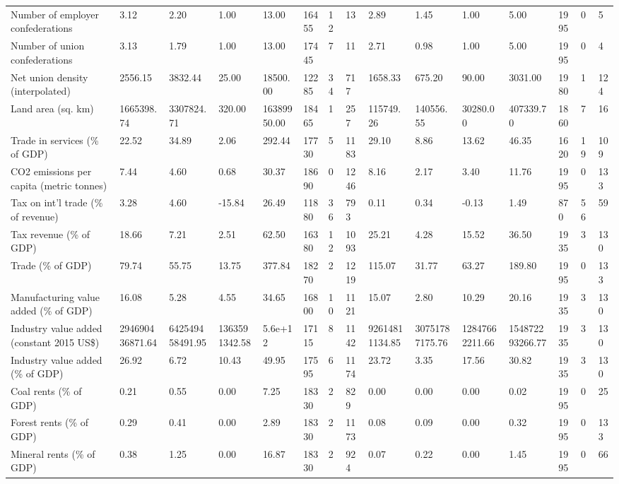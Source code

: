 \begin{longtable}{lllllllllllllll}
\addlinespace
Number of employer confederations & 3.12 & 2.20 & 1.00 & 13.00 & 16455 & 12 & 13 & 2.89 & 1.45 & 1.00 & 5.00 & 1995 & 0 & 5\\
Number of union confederations & 3.13 & 1.79 & 1.00 & 13.00 & 17445 & 7 & 11 & 2.71 & 0.98 & 1.00 & 5.00 & 1995 & 0 & 4\\
Net union density (interpolated) & 2556.15 & 3832.44 & 25.00 & 18500.00 & 12285 & 34 & 717 & 1658.33 & 675.20 & 90.00 & 3031.00 & 1980 & 1 & 124\\
Land area (sq. km) & 1665398.74 & 3307824.71 & 320.00 & 16389950.00 & 18465 & 1 & 257 & 115749.26 & 140556.55 & 30280.00 & 407339.70 & 1860 & 7 & 16\\
Trade in services (\% of GDP) & 22.52 & 34.89 & 2.06 & 292.44 & 17730 & 5 & 1183 & 29.10 & 8.86 & 13.62 & 46.35 & 1620 & 19 & 109\\
\addlinespace
CO2 emissions per capita (metric tonnes) & 7.44 & 4.60 & 0.68 & 30.37 & 18690 & 0 & 1246 & 8.16 & 2.17 & 3.40 & 11.76 & 1995 & 0 & 133\\
Tax on int'l trade (\% of revenue) & 3.28 & 4.60 & -15.84 & 26.49 & 11880 & 36 & 793 & 0.11 & 0.34 & -0.13 & 1.49 & 870 & 56 & 59\\
Tax revenue (\% of GDP) & 18.66 & 7.21 & 2.51 & 62.50 & 16380 & 12 & 1093 & 25.21 & 4.28 & 15.52 & 36.50 & 1935 & 3 & 130\\
Trade (\% of GDP) & 79.74 & 55.75 & 13.75 & 377.84 & 18270 & 2 & 1219 & 115.07 & 31.77 & 63.27 & 189.80 & 1995 & 0 & 133\\
Manufacturing value added (\% of GDP) & 16.08 & 5.28 & 4.55 & 34.65 & 16800 & 10 & 1121 & 15.07 & 2.80 & 10.29 & 20.16 & 1935 & 3 & 130\\
\addlinespace
Industry value added (constant 2015 US\$) & 294690436871.64 & 642549458491.95 & 1363591342.58 & 5.6e+12 & 17115 & 8 & 1142 & 92614811134.85 & 30751787175.76 & 12847662211.66 & 154872293266.77 & 1935 & 3 & 130\\
Industry value added (\% of GDP) & 26.92 & 6.72 & 10.43 & 49.95 & 17595 & 6 & 1174 & 23.72 & 3.35 & 17.56 & 30.82 & 1935 & 3 & 130\\
Coal rents (\% of GDP) & 0.21 & 0.55 & 0.00 & 7.25 & 18330 & 2 & 829 & 0.00 & 0.00 & 0.00 & 0.02 & 1995 & 0 & 25\\
Forest rents (\% of GDP) & 0.29 & 0.41 & 0.00 & 2.89 & 18330 & 2 & 1173 & 0.08 & 0.09 & 0.00 & 0.32 & 1995 & 0 & 133\\
Mineral rents (\% of GDP) & 0.38 & 1.25 & 0.00 & 16.87 & 18330 & 2 & 924 & 0.07 & 0.22 & 0.00 & 1.45 & 1995 & 0 & 66\\

\end{longtable}
